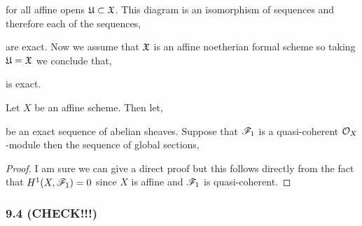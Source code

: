 \documentclass[12pt]{article}
\begin{document}
\begin{enumerate}
\begin{center}
\end{center}
for all affine opens $\mathfrak{U} \subset \mathfrak{X}$. This diagram is an isomorphism of sequences and therefore each of the sequences,
\begin{center}
\end{center}
are exact. Now we assume that $\mathfrak{X}$ is an affine noetherian formal scheme so taking $\mathfrak{U} = \mathfrak{X}$ we conclude that,
\begin{center}
\end{center}
is exact.
\end{enumerate}

\begin{lemma}
Let $X$ be an affine scheme. Then let,
\begin{center}
\end{center}
be an exact sequence of abelian sheaves. Suppose that $\mathscr{F}_1$ is a quasi-coherent $\mathcal{O}_{X}$-module then the sequence of global sections,
\begin{center}
\end{center}
\end{lemma}

\begin{proof}
I am sure we can give a direct proof but this follows directly from the fact that $H^1(X, \mathscr{F}_1) = 0$ since $X$ is affine and $\mathscr{F}_1$ is quasi-coherent. 
\end{proof}

\subsubsection{9.4 (CHECK!!!)}
\end{document}
